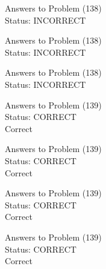 \documentclass[11pt]{article}
\begin{document}
\begin{minipage}[t]{0.5\textwidth}
  {\centering
  
  Answers to Problem (138)\\
  Status: INCORRECT\\
  
  }
\end{minipage}
\begin{minipage}[t]{0.5\textwidth}
  {\centering
  
  Answers to Problem (138)\\
  Status: INCORRECT\\
  
  }
\end{minipage}
\begin{minipage}[t]{0.5\textwidth}
  {\centering
  
  Answers to Problem (138)\\
  Status: INCORRECT\\
  
  }
\end{minipage}
\begin{minipage}[t]{0.5\textwidth}
  {\centering
  
  Answers to Problem (139)\\
  Status: CORRECT\\
  Correct\\
  }
\end{minipage}
\begin{minipage}[t]{0.5\textwidth}
  {\centering
  
  Answers to Problem (139)\\
  Status: CORRECT\\
  Correct\\
  }
\end{minipage}
\begin{minipage}[t]{0.5\textwidth}
  {\centering
  
  Answers to Problem (139)\\
  Status: CORRECT\\
  Correct\\
  }
\end{minipage}
\begin{minipage}[t]{0.5\textwidth}
  {\centering
  
  Answers to Problem (139)\\
  Status: CORRECT\\
  Correct\\
  }
\end{minipage}
\end{document}
